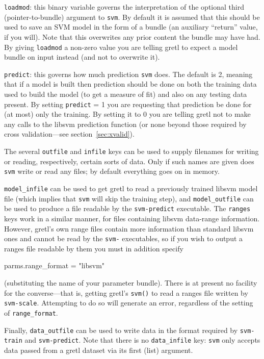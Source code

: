 \documentclass{article}
\begin{document}
\texttt{loadmod}: this binary variable governs the interpretation of
the optional third (pointer-to-bundle) argument to \texttt{svm}. By
default it is assumed that this should be used to save an SVM model in
the form of a bundle (an auxiliary ``return'' value, if you
will). Note that this overwrites any prior content the bundle may have
had. By giving \texttt{loadmod} a non-zero value you are telling gretl
to expect a model bundle on input instead (and not to overwrite it).

\texttt{predict}: this governs how much prediction \texttt{svm} does.
The default is 2, meaning that if a model is built then prediction
should be done on both the training data used to build the model (to
get a measure of fit) and also on any testing data present. By setting
\texttt{predict} = 1 you are requesting that prediction be done for
(at most) only the training. By setting it to 0 you are telling gretl
not to make any calls to the \textsf{libsvm} prediction function (or
none beyond those required by cross validation---see
section~\ref{sec:xvalid}).

The several \texttt{outfile} and \texttt{infile} keys can be used to
supply filenames for writing or reading, respectively, certain sorts
of data. Only if such names are given does \texttt{svm} write or read
any files; by default everything goes on in memory.

\texttt{model\_infile} can be used to get gretl to read a previously
trained \textsf{libsvm} model file (which implies that \texttt{svm}
will skip the training step), and \texttt{model\_outfile} can be used
to produce a file readable by the \texttt{svm-predict} executable.
The \texttt{ranges} keys work in a similar manner, for files
containing \textsf{libsvm} data-range information. However, gretl's
own range files contain more information than standard \textsf{libsvm}
ones and cannot be read by the \texttt{svm-} executables, so if you
wish to output a ranges file readable by them you must in addition
specify
\begin{code}
parms.range_format = "libsvm"
\end{code}
(substituting the name of your parameter bundle). There is at present
no facility for the converse---that is, getting gretl's \texttt{svm()}
to read a ranges file written by \texttt{svm-scale}. Attempting to do
so will generate an error, regardless of the setting of
\texttt{range\_format}.

Finally, \texttt{data\_outfile} can be used to write data in the
format required by \texttt{svm-train} and \texttt{svm-predict}. Note
that there is no \texttt{data\_infile} key: \texttt{svm} only accepts
data passed from a gretl dataset via its first (list) argument.
\end{document}
